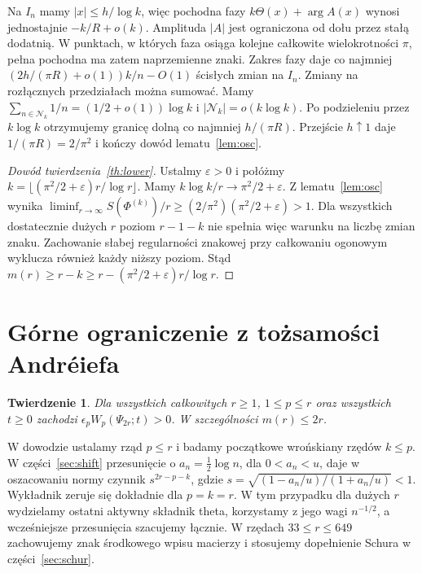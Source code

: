 \documentclass[11pt,a4paper,reqno]{amsart}
\newtheorem{theorem}{Twierdzenie}[section]
\numberwithin{equation}{section}
\begin{document}
Na \(I_n\) mamy \(|x|\le h/\log k\), więc pochodna fazy \(k\Theta(x)+\arg A(x)\) wynosi jednostajnie \(-k/R+o(k)\). Amplituda \(|A|\) jest ograniczona od dołu przez stałą dodatnią. W punktach, w których faza osiąga kolejne całkowite wielokrotności \(\pi\), pełna pochodna ma zatem naprzemienne znaki. Zakres fazy daje co najmniej \((2h/(\pi R)+o(1))k/n-O(1)\) ścisłych zmian na \(I_n\). Zmiany na rozłącznych przedziałach można sumować. Mamy \(\sum_{n\in\mathcal N_k}1/n=(1/2+o(1))\log k\) i \(|\mathcal N_k|=o(k\log k)\). Po podzieleniu przez \(k\log k\) otrzymujemy granicę dolną co najmniej \(h/(\pi R)\). Przejście \(h\uparrow1\) daje \(1/(\pi R)=2/\pi^2\) i kończy dowód lematu~\ref{lem:osc}.

\begin{proof}[Dowód twierdzenia~\ref{th:lower}]
Ustalmy \(\varepsilon>0\) i połóżmy \(k=\lfloor(\pi^2/2+\varepsilon)r/\log r\rfloor\). Mamy \(k\log k/r\to\pi^2/2+\varepsilon\). Z lematu~\ref{lem:osc} wynika \(\liminf_{r\to\infty}S(\Phi^{(k)})/r\ge(2/\pi^2)(\pi^2/2+\varepsilon)>1\). Dla wszystkich dostatecznie dużych \(r\) poziom \(r-1-k\) nie spełnia więc warunku na liczbę zmian znaku. Zachowanie słabej regularności znakowej przy całkowaniu ogonowym wyklucza również każdy niższy poziom. Stąd \(m(r)\ge r-k\ge r-(\pi^2/2+\varepsilon)r/\log r\).
\end{proof}

\section{Górne ograniczenie z tożsamości Andréiefa}\label{sec:upper}


\begin{theorem}\label{th:upper}
Dla wszystkich całkowitych \(r\ge1\), \(1\le p\le r\) oraz wszystkich \(t\ge0\) zachodzi \(\epsilon_p W_p(\Psi_{2r};t)>0\). W szczególności \(m(r)\le2r\).
\end{theorem}


W dowodzie ustalamy rząd \(p\le r\) i badamy początkowe wrońskiany rzędów \(k\le p\). W części~\ref{sec:shift} przesunięcie o \(a_n=\tfrac12\log n\), dla \(0<a_n<u\), daje w oszacowaniu normy czynnik \(s^{2r-p-k}\), gdzie \(s=\sqrt{(1-a_n/u)/(1+a_n/u)}<1\). Wykładnik zeruje się dokładnie dla \(p=k=r\). W tym przypadku dla dużych \(r\) wydzielamy ostatni aktywny składnik theta, korzystamy z jego wagi \(n^{-1/2}\), a wcześniejsze przesunięcia szacujemy łącznie. W rzędach \(33\le r\le649\) zachowujemy znak środkowego wpisu macierzy i stosujemy dopełnienie Schura w części~\ref{sec:schur}.
\end{document}
